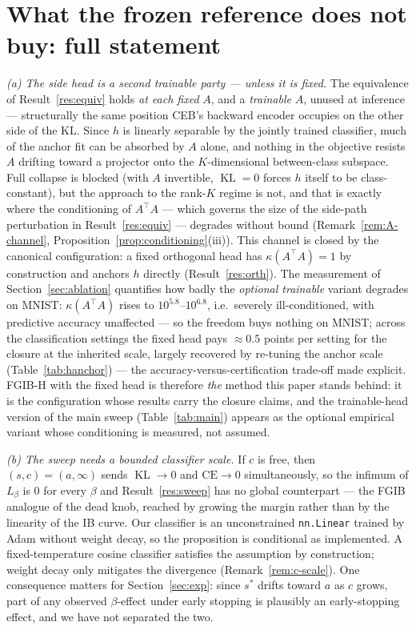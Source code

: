 \documentclass{article} %
\newcommand{\KLd}{\operatorname{KL}}
\newcommand{\CE}{\mathrm{CE}}
\begin{document}
\section{What the frozen reference does not buy: full statement}
\label{app:limits}

\emph{(a) The side head is a second trainable party --- unless it is fixed.} The
equivalence of
Result~\ref{res:equiv} holds \emph{at each fixed} $A$, and a \emph{trainable} $A$, unused
at
inference --- structurally the same position CEB's backward encoder occupies on the other
side of the KL. Since $h$ is linearly separable by the jointly trained classifier, much of
the anchor fit can be absorbed by $A$ alone, and nothing in the objective resists $A$
drifting toward a projector onto the $K$-dimensional between-class subspace. Full collapse
is blocked (with $A$ invertible, $\KLd = 0$ forces $h$ itself to be class-constant), but
the approach to the rank-$K$ regime is not, and that is exactly where the conditioning of
$A^{\top}A$ --- which governs the size of the side-path perturbation in
Result~\ref{res:equiv} --- degrades without bound (Remark~\ref{rem:A-channel},
Proposition~\ref{prop:conditioning}(iii)). This channel is closed by the canonical
configuration: a fixed orthogonal head has $\kappa(A^{\top}A) = 1$ by construction and
anchors $h$ directly (Result~\ref{res:orth}). The
measurement of Section~\ref{sec:ablation} quantifies how badly the \emph{optional
trainable} variant degrades on MNIST:
$\kappa(A^{\top}A)$ rises to $10^{5.8}$--$10^{6.8}$, i.e.\ severely ill-conditioned,
with predictive accuracy unaffected --- so the freedom buys nothing on MNIST; across
the classification settings the fixed head pays $\approx 0.5$ points per setting for the
closure at the inherited scale, largely recovered by re-tuning the anchor scale
(Table~\ref{tab:hanchor}) --- the accuracy-versus-certification trade-off made
explicit. FGIB-H with the fixed head is therefore \emph{the} method this paper stands
behind: it is the configuration whose results carry the closure claims, and the
trainable-head version of the main sweep (Table~\ref{tab:main}) appears as the optional
empirical variant whose conditioning is measured, not assumed.

\emph{(b) The sweep needs a bounded classifier scale.} If $c$ is free, then
$(s,c) = (a,\infty)$ sends $\KLd \to 0$ and $\CE \to 0$ simultaneously, so the infimum of
$L_\beta$ is $0$ for every $\beta$ and Result~\ref{res:sweep} has no global counterpart
--- the FGIB analogue of the dead knob, reached by growing the margin rather than by the
linearity of the IB curve. Our classifier is an unconstrained \texttt{nn.Linear} trained
by Adam without weight decay, so the proposition is conditional as implemented. A
fixed-temperature cosine classifier satisfies the assumption by construction; weight decay
only mitigates the divergence (Remark~\ref{rem:c-scale}). One consequence matters for
Section~\ref{sec:exp}: since $s^*$ drifts toward $a$ as $c$ grows, part of any observed
$\beta$-effect under early stopping is plausibly an early-stopping effect, and we have not
separated the two.
\end{document}
